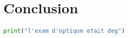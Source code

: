 \documentclass[11pt,letterpaper]{article}
\begin{document}




\section{Conclusion}


\begin{lstlisting}[language=python]
print("l'exam d'optique etait deg")
\end{lstlisting}



\clearpage

% 
% 
\end{document}
